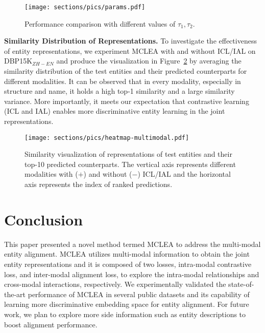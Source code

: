 \documentclass[11pt]{article}
\begin{document}
\begin{figure}[h]
    \centering
    \texttt{[image: sections/pics/params.pdf]}
    \caption{Performance comparison with different values of $\tau_1, \tau_2$.}
    \label{fig:params}
\end{figure}

\noindent\textbf{Similarity Distribution of Representations.}
To investigate the effectiveness of entity representations, we experiment MCLEA with and without ICL/IAL on DBP15K$_{ZH-EN}$ and produce the visualization in Figure~\ref{fig:sim-dist} by averaging the similarity distribution of the test entities and their predicted counterparts for different modalities.
It can be observed that in every modality, especially in structure and name, it holds a high top-1 similarity and a large similarity variance.
More importantly, it meets our expectation that contrastive learning (ICL and IAL) enables more discriminative entity learning in the joint representations.

\begin{figure}[h]
    \centering
    \texttt{[image: sections/pics/heatmap-multimodal.pdf]}
    \caption{Similarity visualization of representations of test entities and their top-10 predicted counterparts. The vertical axis represents different modalities with ($+$) and without ($-$) ICL/IAL and the horizontal axis represents the index of ranked predictions.}
    \label{fig:sim-dist}
\end{figure} 
 \section{Conclusion}



This paper presented a novel method termed MCLEA to address the multi-modal entity alignment.
MCLEA utilizes multi-modal information to obtain the joint entity representations and it is composed of two losses, intra-modal contrastive loss, and inter-modal alignment loss, to explore the intra-modal relationships and cross-modal interactions, respectively.
We experimentally validated the state-of-the-art performance of MCLEA in several public datasets and its capability of learning more discriminative embedding space for entity alignment.
For future work, we plan to explore more side information such as entity descriptions to boost alignment performance.

%
 
\end{document}
